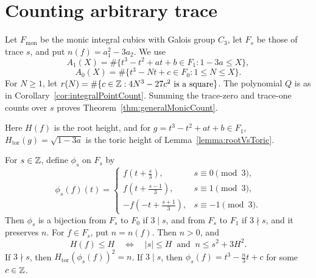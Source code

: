 \chapter{Counting arbitrary trace}

Let $F_{\mathrm{mon}}$ be the monic integral cubics with Galois group $C_3$, let $F_s$ be those of trace $s$, and put $n(f)=a_1^2-3a_2$. We use \[A_1(X)=\#\{t^3-t^2+at+b\in F_1:1-3a\leq X\},\] \[A_0(X)=\#\{t^3-Nt+c\in F_0:1\leq N\leq X\}.\] For $N\geq1$, let $r(N)=\#\{c\in\mathbb{Z}:4N^3-27c^2\text{ is a square}\}$. The polynomial $Q$ is as in Corollary~\ref{cor:integralPointCount}. Summing the trace-zero and trace-one counts over $s$ proves Theorem~\ref{thm:generalMonicCount}.

\begin{lemma}

\label{lemma:generalHeightReduction}


\leanok

Here $H(f)$ is the root height, and for $g=t^3-t^2+at+b\in F_1$, $H_{\mathrm{tor}}(g)=\sqrt{1-3a}$ is the toric height of Lemma~\ref{lemma:rootVsToric}.

 For $s\in\mathbb{Z}$, define $\phi_s$ on $F_s$ by \[ \phi_s(f)(t)= \begin{cases} f(t+\tfrac{s}{3}),&s\equiv0\pmod3,\\ f(t+\tfrac{s-1}{3}),&s\equiv1\pmod3,\\ -f(-t+\tfrac{s+1}{3}),&s\equiv-1\pmod3. \end{cases} \] Then $\phi_s$ is a bijection from $F_s$ to $F_0$ if $3\mid s$, and from $F_s$ to $F_1$ if $3\nmid s$, and it preserves $n$. For $f\in F_s$, put $n=n(f)$. Then $n>0$, and \[ H(f)\leq H \quad\Longleftrightarrow\quad |s|\leq H\ \text{ and }\ n\leq s^2+3H^2. \] If $3\nmid s$, then $H_{\mathrm{tor}}(\phi_s(f))^2=n$. If $3\mid s$, then $\phi_s(f)=t^3-\frac n3t+c$ for some $c\in\mathbb{Z}$. 

\end{lemma}

